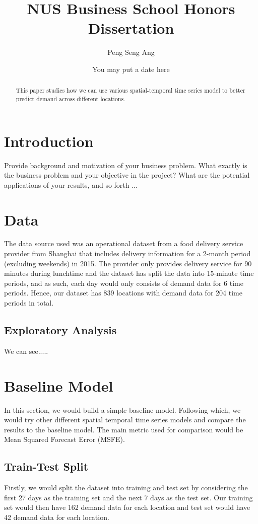 \documentclass[10pt, letterpaper] {article}
\begin{document}
	\title{NUS Business School Honors Dissertation}
	\author{Peng Seng Ang}
	\date{You may put a date here}
	\maketitle
\begin{abstract}
This paper studies how we can use various spatial-temporal time series model to better predict demand across different locations. 
\end{abstract}
\section{Introduction}
Provide background and motivation of your business problem. What exactly is the business problem and your objective in the project? What are the potential applications of your results, and so forth ...
\section{Data}
The data source used was an operational dataset from a food delivery service provider from Shanghai that includes delivery information for a 2-month period (excluding weekends) in 2015. The provider only provides delivery service for 90 minutes during lunchtime and the dataset has split the data into 15-minute time periods, and as such, each day would only consists of demand data for 6 time periods. Hence, our dataset has 839 locations with demand data for 204 time periods in total. 

\subsection{Exploratory Analysis}
We can see.....
\section{Baseline Model}
In this section, we would build a simple baseline model. Following which, we would try other different spatial temporal time series models and compare the results to the baseline model. The main metric used for comparison would be Mean Squared Forecast Error (MSFE). 
\subsection{Train-Test Split}
Firstly, we would split the dataset into training and test set by considering the first 27 days as the training set and the next 7 days as the test set. Our training set would then have 162 demand data for each location and test set would have 42 demand data for each location. 
\end{document}
